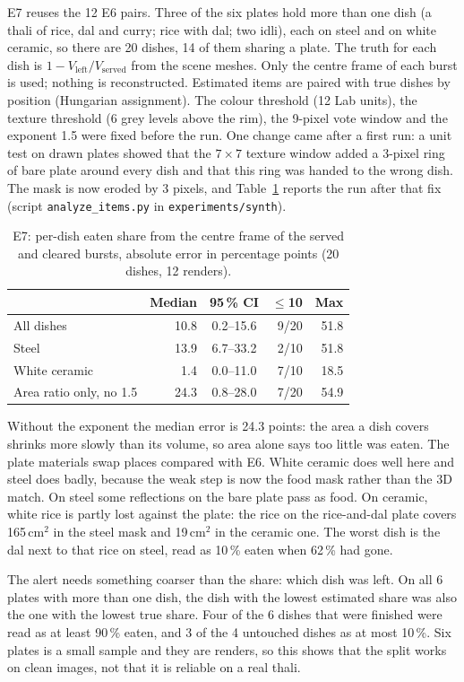 E7 reuses the 12 E6 pairs. Three of the six plates hold more than one dish
(a thali of rice, dal and curry; rice with dal; two idli), each on steel and on
white ceramic, so there are 20 dishes, 14 of them sharing a plate. The truth for
each dish is $1-V_\text{left}/V_\text{served}$ from the scene meshes. Only the
centre frame of each burst is used; nothing is reconstructed. Estimated items
are paired with true dishes by position (Hungarian assignment). The colour
threshold (12 Lab units), the texture threshold (6 grey levels above the rim),
the 9-pixel vote window and the exponent 1.5 were fixed before the run. One
change came after a first run: a unit test on drawn plates showed that the
$7\times7$ texture window added a 3-pixel ring of bare plate around every dish
and that this ring was handed to the wrong dish. The mask is now eroded by 3
pixels, and Table~\ref{tab:e7} reports the run after that fix
(script \texttt{analyze\_items.py} in \texttt{experiments/synth}).

\begin{table}[t]\centering
\caption{E7: per-dish eaten share from the centre frame of the served and
cleared bursts, absolute error in percentage points (20 dishes, 12 renders).}
\label{tab:e7}
\begin{tabular}{lrcrr}
\toprule
 & Median & 95\,\% CI & $\le$10 & Max\\
\midrule
All dishes & 10.8 & 0.2--15.6 & 9/20 & 51.8\\
Steel & 13.9 & 6.7--33.2 & 2/10 & 51.8\\
White ceramic & 1.4 & 0.0--11.0 & 7/10 & 18.5\\
Area ratio only, no 1.5 & 24.3 & 0.8--28.0 & 7/20 & 54.9\\
\bottomrule
\end{tabular}
\end{table}

Without the exponent the median error is 24.3 points: the area a dish covers
shrinks more slowly than its volume, so area alone says too little was eaten.
The plate materials swap places compared with E6. White ceramic does well here
and steel does badly, because the weak step is now the food mask rather than the
3D match. On steel some reflections on the bare plate pass as food. On ceramic,
white rice is partly lost against the plate: the rice on the rice-and-dal plate
covers 165\,cm$^2$ in the steel mask and 19\,cm$^2$ in the ceramic one. The worst
dish is the dal next to that rice on steel, read as 10\,\% eaten when 62\,\% had
gone.

The alert needs something coarser than the share: which dish was left. On all
6 plates with more than one dish, the dish with the lowest estimated share was
also the one with the lowest true share. Four of the 6 dishes that were
finished were read as at least 90\,\% eaten, and 3 of the 4 untouched dishes as
at most 10\,\%. Six plates is a small sample and they are renders, so this shows
that the split works on clean images, not that it is reliable on a real thali.
